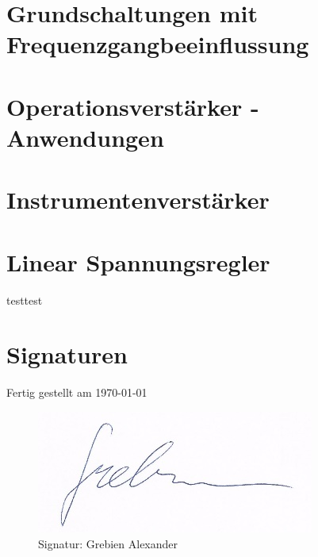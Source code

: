 \chapter{Grundschaltungen mit Frequenzgangbeeinflussung}


\chapter{Operationsverstärker - Anwendungen}


\chapter{Instrumentenverstärker}


\chapter{Linear Spannungsregler}


testtest
\newpage
\chapter{Signaturen}
    Fertig gestellt am \today \\
    \begin{figure}[H]
        \centering
        \includegraphics{pics/signature_grebien.png}
    	\caption{Signatur: Grebien Alexander}
    	\label{pic:signatur_grebien}
    \end{figure}
        
\listoffigures
\listoftables


